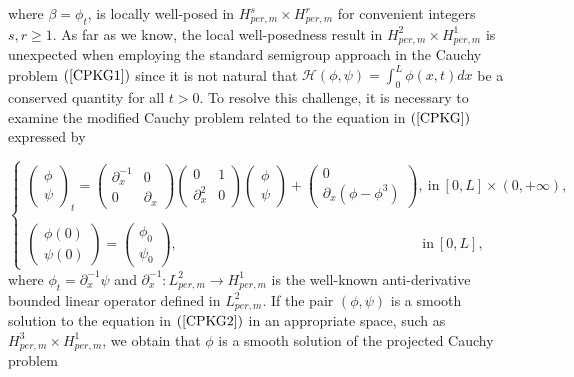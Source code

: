 \documentclass[12pt,reqno,a4paper]{amsart} %
\numberwithin{equation}{section}
\numberwithin{figure}{section}
\begin{document}
where $\beta=\phi_t$, is locally well-posed in $H_{per,m}^s\times H_{per,m}^r$ for convenient integers $s,r\geq1$. As far as we know, the local well-posedness result in $H_{per,m}^2\times H_{per,m}^1$ is unexpected when employing the standard semigroup approach in the Cauchy problem $(\ref{CPKG1})$ since it is not natural that $\displaystyle\mathcal{H}(\phi,\psi)=\int_0^L\phi(x,t)dx$ be a conserved quantity for all $t>0$. 
 To resolve this challenge, it is necessary to examine the modified  Cauchy problem related to the equation in $(\ref{CPKG})$ expressed by

\begin{equation}\label{CPKG2}
\begin{cases}
	\left(\begin{array}{lll}\phi\\\psi\end{array}\right)_t
	=\left(\begin{array}{lll}\partial_x^{-1}&  0\\ 0&  \partial_x\end{array}\right)\left(\begin{array}{lll}0&  1\\ \partial_x^2&  0\end{array}\right)\left(\begin{array}{lll}\phi\\\psi\end{array}\right)+\left(\begin{array}{ccc}0\\ \partial_x(\phi-\phi^3)\end{array}\right),\:\text{in} \: [0,L]\times(0,+\infty),\\\\
	\left(\begin{array}{lll}\phi(0)\\\psi(0)\end{array}\right)=\left(\begin{array}{ccc}\phi_0\\ \psi_0\end{array}\right), \:\:\:\:\:\:\:\:\:\:\:\:\:\:\:\:\:\:\:\:\:\:\:\:\:\:\:\:\:\:\:\:\:\:\:\:\:\:\:\:\:\:\:\:\:\:\:\:\:\:\:\:\:\:\:\: \:\:\:\:\: \:\:\:\:\: \:\:\:\:\: \:\:\:\:\:\:\:\:  \text{in} \: [0,L],
\end{cases}
\end{equation}
where $\phi_t=\partial_x^{-1}\psi$ and $\partial_x^{-1}:L_{per,m}^2\rightarrow H_{per,m}^1$ is the well-known anti-derivative bounded linear operator defined in $L_{per,m}^2$. If the pair $(\phi,\psi)$ is a smooth solution to the equation in $(\ref{CPKG2})$ in an appropriate space, such as $H_{per,m}^3\times H_{per,m}^1$, we obtain that $\phi$ is a smooth solution of the projected Cauchy problem 
\end{document}
